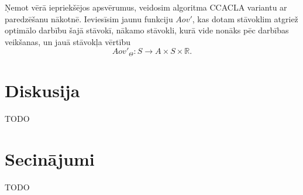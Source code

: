 \documentclass{ludis} %
\begin{document}
Ņemot vērā iepriekšējos apsvērumus, veidosim algoritma CCACLA variantu ar
paredzēšanu nākotnē. Ieviesīsim jaunu funkciju $Aov'$, kas dotam stāvoklim
atgriež optimālo darbību šajā stāvokī, nākamo stāvokli, kurā vide nonāks pēc
darbības veikšanas, un jauā stāvokļa vērtību
\begin{equation}
  Aov'_\Theta:S \rightarrow A \times S \times \mathbb{R}.
\end{equation}


 
\chapter{Diskusija}
TODO
\chapter{Secinājumi}
TODO


\printbibliography
\end{document}
